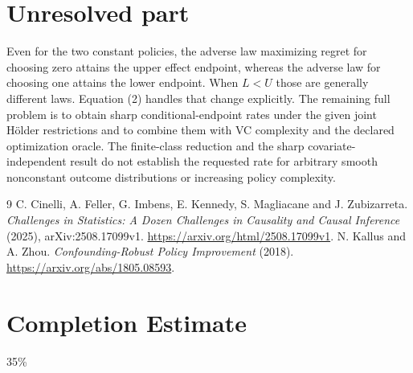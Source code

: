 \documentclass[11pt]{article}
\theoremstyle{definition}
\begin{document}
\section*{Unresolved part}
Even for the two constant policies, the adverse law maximizing regret
for choosing zero attains the upper effect endpoint, whereas the adverse
law for choosing one attains the lower endpoint. When $L<U$ those are
generally different laws. Equation (2) handles that change explicitly.
The remaining full problem is to obtain sharp conditional-endpoint rates
under the given joint H\"older restrictions and to combine them with VC
complexity and the declared optimization oracle. The finite-class reduction
and the sharp covariate-independent result do not establish the requested
rate for arbitrary smooth nonconstant outcome distributions or increasing
policy complexity.

\begin{thebibliography}{9}
 C. Cinelli, A. Feller, G. Imbens, E. Kennedy, S. Magliacane and J. Zubizarreta.
\emph{Challenges in Statistics: A Dozen Challenges in Causality and Causal Inference} (2025), arXiv:2508.17099v1.
\url{https://arxiv.org/html/2508.17099v1}.
 N. Kallus and A. Zhou.
\emph{Confounding-Robust Policy Improvement} (2018).
\url{https://arxiv.org/abs/1805.08593}.
\end{thebibliography}
\section{Completion Estimate}
35\%
\end{document}
